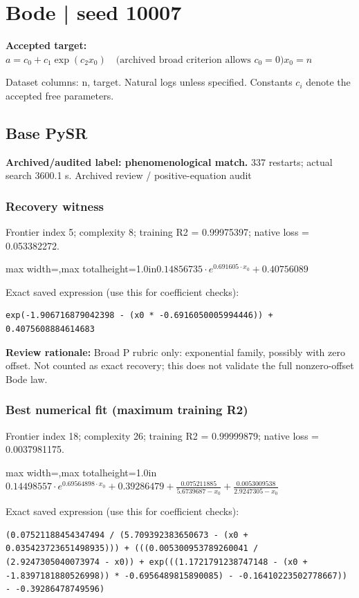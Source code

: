 \documentclass[10pt,letterpaper,landscape]{article}
\begin{document}
\section*{Bode | seed 10007}
\textbf{Accepted target:} $\displaystyle a=c_0+c_1\exp(c_2x_0)\quad\text{(archived broad criterion allows }c_0=0\text{)}$\hfill $x_0=n$\par
{\small Dataset columns: n, target. Natural logs unless specified. Constants $c_i$ denote the accepted free parameters.}\par\medskip
\begin{minipage}[t]{0.485\textwidth}
\subsection*{Base PySR}
\textbf{Archived/audited label: phenomenological match.} 337 restarts; actual search 3600.1 s.
{\small Archived review / positive-equation audit}
\subsubsection*{Recovery witness}
Frontier index 5; complexity 8; training R2 = 0.99975397; native loss = 0.053382272.
\begin{center}\begin{adjustbox}{max width=\linewidth,max totalheight=1.0in}$\displaystyle 0.14856735 \cdot e^{0.691605 \cdot x_{0}} + 0.40756089$\end{adjustbox}\end{center}
{\scriptsize Exact saved expression (use this for coefficient checks):}
\begin{lstlisting}
exp(-1.906716879042398 - (x0 * -0.6916050005994446)) + 0.4075608884614683
\end{lstlisting}
{\small\textbf{Review rationale:} Broad P rubric only: exponential family, possibly with zero offset. Not counted as exact recovery; this does not validate the full nonzero-offset Bode law.}
\subsubsection*{Best numerical fit (maximum training R2)}
Frontier index 18; complexity 26; training R2 = 0.99999879; native loss = 0.0037981175.
\begin{center}\begin{adjustbox}{max width=\linewidth,max totalheight=1.0in}$\displaystyle 0.14498557 \cdot e^{0.69564898 \cdot x_{0}} + 0.39286479 + \frac{0.075211885}{5.6739687 - x_{0}} + \frac{0.0053009538}{2.9247305 - x_{0}}$\end{adjustbox}\end{center}
{\scriptsize Exact saved expression (use this for coefficient checks):}
\begin{lstlisting}
(0.07521188454347494 / (5.709392383650673 - (x0 + 0.035423723651498935))) + (((0.005300953789260041 / (2.9247305040073974 - x0)) + exp(((1.1721791238747148 - (x0 + -1.8397181880526998)) * -0.6956489815890085) - -0.16410223502778667)) - -0.39286478749596)
\end{lstlisting}
\end{minipage}\hfill
\end{document}

